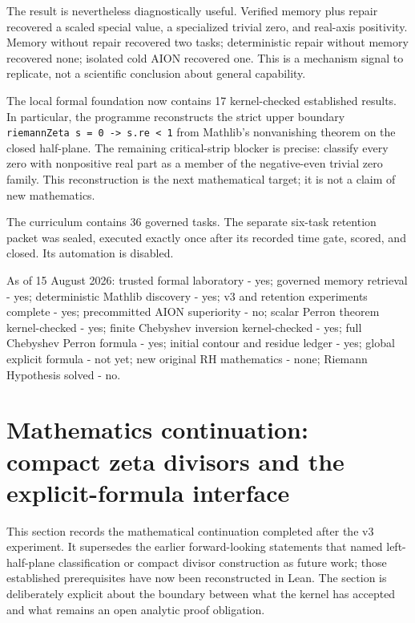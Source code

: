 \documentclass[11pt,a4paper]{article}
\newcommand{\code}[1]{\texttt{#1}}
\begin{document}
The result is nevertheless diagnostically useful. Verified memory plus repair
recovered a scaled special value, a specialized trivial zero, and real-axis
positivity. Memory without repair recovered two tasks; deterministic repair
without memory recovered none; isolated cold AION recovered one. This is a
mechanism signal to replicate, not a scientific conclusion about general
capability.

The local formal foundation now contains 17 kernel-checked established results.
In particular, the programme reconstructs the strict upper boundary
\code{riemannZeta s = 0 -> s.re < 1} from Mathlib's nonvanishing theorem on the
closed half-plane. The remaining critical-strip blocker is precise: classify
every zero with nonpositive real part as a member of the negative-even trivial
zero family. This reconstruction is the next mathematical target; it is not a
claim of new mathematics.

The curriculum contains 36 governed tasks. The separate six-task retention
packet was sealed, executed exactly once after its recorded time gate, scored,
and closed. Its automation is disabled.

\begin{truthbox}
As of 15 August 2026: trusted formal laboratory - yes; governed memory
retrieval - yes; deterministic Mathlib discovery - yes; v3 and retention
experiments complete - yes; precommitted AION superiority - no; scalar Perron
theorem kernel-checked - yes; finite Chebyshev inversion kernel-checked - yes;
full Chebyshev Perron formula - yes; initial contour and residue ledger - yes;
global explicit formula - not yet; new original RH mathematics - none;
Riemann Hypothesis solved - no.
\end{truthbox}

\clearpage
\section{Mathematics continuation: compact zeta divisors and the explicit-formula interface}
\label{sec:compact-divisor-explicit-formula}

This section records the mathematical continuation completed after the v3
experiment. It supersedes the earlier forward-looking statements that named
left-half-plane classification or compact divisor construction as future work;
those established prerequisites have now been reconstructed in Lean. The
section is deliberately explicit about the boundary between what the kernel has
accepted and what remains an open analytic proof obligation.
\end{document}
